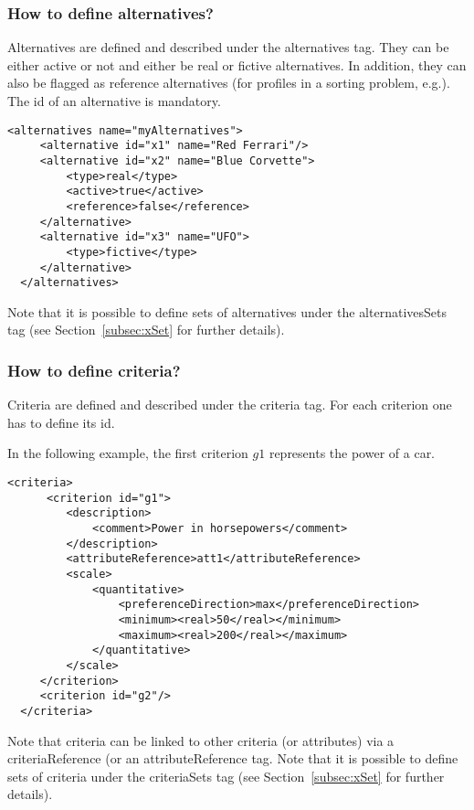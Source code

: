 \documentclass[a4paper,oneside,10 pt]{article}
\newcommand{\code}{\asciifamily}
\begin{document}
\subsubsection{How to define alternatives?}

Alternatives are defined and described under the {\code alternatives} tag. They can be either {\code active} or not and either be {\code real} or {\code fictive} alternatives. In addition, they can also be flagged as {\code reference} alternatives (for profiles in a sorting problem, e.g.). The {\code id} of an alternative is mandatory.  

{\code
\begin{lstlisting}[style=prototype]
 <alternatives name="myAlternatives">
	 <alternative id="x1" name="Red Ferrari"/>
	 <alternative id="x2" name="Blue Corvette">
		 <type>real</type>
		 <active>true</active>
		 <reference>false</reference>
	 </alternative>
	 <alternative id="x3" name="UFO">
		 <type>fictive</type>
	 </alternative>
  </alternatives>
\end{lstlisting}
}

Note that it is possible to define sets of alternatives under the {\code alternativesSets} tag (see Section~\ref{subsec:xSet} for further details).

\subsubsection{How to define criteria?}

Criteria are defined and described under the {\code criteria} tag. For each criterion one has to define its {\code id}. 

In the following example, the first criterion $g1$ represents the power of a car. 

{\code
\begin{lstlisting}[style=prototype]
 <criteria>
	  <criterion id="g1">
		 <description>
			 <comment>Power in horsepowers</comment>
		 </description>
		 <attributeReference>att1</attributeReference>
		 <scale>
			 <quantitative>
				 <preferenceDirection>max</preferenceDirection>
				 <minimum><real>50</real></minimum>
				 <maximum><real>200</real></maximum>
			 </quantitative>
		 </scale>
	 </criterion>
	 <criterion id="g2"/>
  </criteria>
\end{lstlisting}
}

Note that criteria can be linked to other criteria (or attributes) via a {\code criteriaReference} (or an {\code attributeReference} tag. Note that it is possible to define sets of criteria under the {\code criteriaSets} tag (see Section~\ref{subsec:xSet} for further details).
\end{document}
